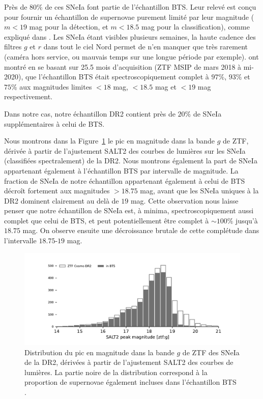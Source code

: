 \documentclass[../main/main.tex]{subfiles}
\begin{document}
Près de $80\%$ de ces SNeIa font partie de l'échantillon BTS. Leur relevé
est conçu pour fournir un échantillon de supernovae purement limité par
leur magnitude ($m<19$ mag pour la détection, et $m<18.5$ mag pour la
classification), comme expliqué dans
\citet{FremlingZTFspec2020,PerleyBTSII2020}. Les SNeIa étant visibles
plusieurs semaines, la haute cadence des filtres $g$ et $r$ dans tout le
ciel Nord permet de n'en manquer que très rarement (caméra hors service,
ou mauvais temps sur une longue période par
exemple). \citet{PerleyBTSII2020} ont montré en se basant sur 25.5 mois
d'acquisition (ZTF MSIP de mars 2018 à mi-2020), que l'échantillon BTS
était spectroscopiquement complet à $97\%$, $93\%$ et $75\%$ aux
magnitudes limites $<18$ mag, $<18.5$ mag et $<19$ mag respectivement.

Dans notre cas, notre échantillon DR2 contient près de $20\%$ de SNeIa
supplémentaires à celui de BTS.

Nous montrons dans la Figure~\ref{fig:target_peakmaggBTS} le pic en
magnitude dans la bande $g$ de ZTF, dérivée à partir de l'ajustement
SALT2 des courbes de lumières sur les SNeIa (classifiées spectralement) de
la DR2. Nous montrons également la part de SNeIa appartenant également à
l'échantillon BTS par intervalle de magnitude. La fraction de SNeIa de
notre échantillon appartenant également à celui de BTS décroît fortement
aux magnitudes $>18.75$ mag, avant que les SNeIa uniques à la DR2
dominent clairement au delà de $19$ mag. Cette observation nous laisse
penser que notre échantillon de SNeIa est, à minima, spectroscopiquement
aussi complet que celui de BTS, et peut potentiellement être complet à $\sim100\%$
jusqu'à $18.75$ mag. On observe ensuite une décroissance brutale de cette complétude dans l'intervalle $18.75$-$19$ mag.

\begin{figure}[ht]
  \centering
  \includegraphics[width=1\textwidth]{../figures/09_dr2/target_peakmagg.pdf}
  \caption[Distribution du pic en
magnitude dans la bande $g$ de ZTF des SNeIa de la DR2.]{Distribution du pic en
magnitude dans la bande $g$ de ZTF des SNeIa de la DR2, dérivées à partir de l'ajustement
SALT2 des courbes de lumières. La partie noire de la distribution
correspond à la proportion de supernovae également incluses dans
l'échantillon BTS \citep{FremlingZTFspec2020,PerleyBTSII2020}.}
  \label{fig:target_peakmaggBTS}
\end{figure}
\end{document}
